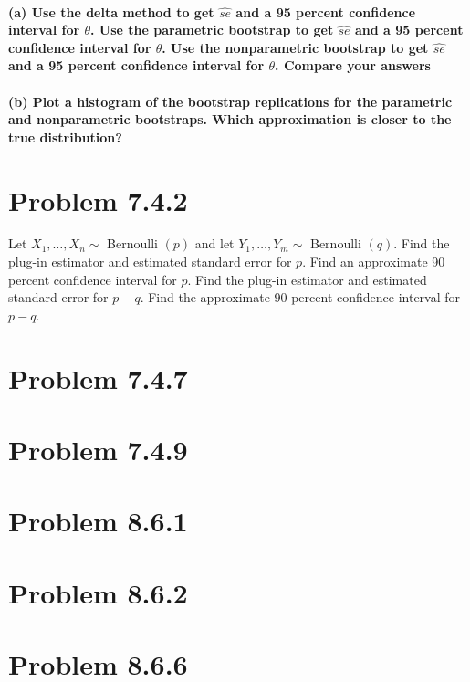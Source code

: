 \documentclass{article}\usepackage[]{graphicx}\usepackage[]{color}
\begin{document}
\paragraph*{(a) Use the delta method to get $\hat{se}$ and a 95 percent confidence interval for $\theta$. Use the parametric bootstrap to get $\hat{se}$ and a 95 percent confidence interval for $\theta$. Use the nonparametric bootstrap to get $\hat{se}$ and a 95 percent confidence interval for $\theta$. Compare your answers}

\paragraph*{(b) Plot a histogram of the bootstrap replications for the parametric and nonparametric bootstraps. Which approximation is closer to the true distribution?}


\section{Problem 7.4.2}
Let $X_{1}, \ldots, X_{n} \sim$ Bernoulli $(p)$ and let $Y_{1}, \ldots, Y_{m} \sim$ Bernoulli $(q)$. Find the plug-in estimator and estimated standard error for $p$. Find an approximate 90 percent confidence interval for $p$. Find the plug-in estimator and estimated standard error for $p - q$. Find the approximate 90 percent confidence interval for $p - q$. 




\section{Problem 7.4.7}





\section{Problem 7.4.9}





\section{Problem 8.6.1}





\section{Problem 8.6.2}




\section{Problem 8.6.6}
\end{document}

